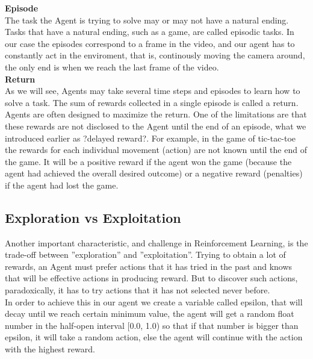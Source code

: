 \textbf{Episode}\\
The task the Agent is trying to solve may or may not have a natural ending. Tasks that have a natural ending, such as a game, are called episodic tasks. In our case the episodes correspond to a frame in the video, and our agent has to constantly act in the enviroment, that is, continously moving the camera around, the only end is when we reach the last frame of the video.\\

\textbf{Return}\\
As we will see, Agents may take several time steps and episodes to learn how to solve a task. The sum of rewards collected in a single episode is called a return. Agents are often designed to maximize the return.
One of the limitations are that these rewards are not disclosed to the Agent until the end of an episode, what we introduced earlier as ?delayed reward?. For example, in the game of tic-tac-toe the rewards for each individual movement (action) are not known until the end of the game. It will be a positive reward if the agent won the game (because the agent had achieved the overall desired outcome) or a negative reward (penalties) if the agent had lost the game.

\subsection{Exploration vs Exploitation}

Another important characteristic, and challenge in Reinforcement Learning, is the trade-off between ''exploration'' and ''exploitation''. Trying to obtain a lot of rewards, an Agent must prefer actions that it has tried in the past and knows that will be effective actions in producing reward. But to discover such actions, paradoxically, it has to try actions that it has not selected never before.\\

In order to achieve this in our agent we create a variable called epsilon, that will decay until we reach certain minimum value, the agent will get a random float number in the half-open interval [0.0, 1.0) so that if that number is bigger than epsilon, it will take a random action, else the agent will continue with the action with the highest reward.\\


